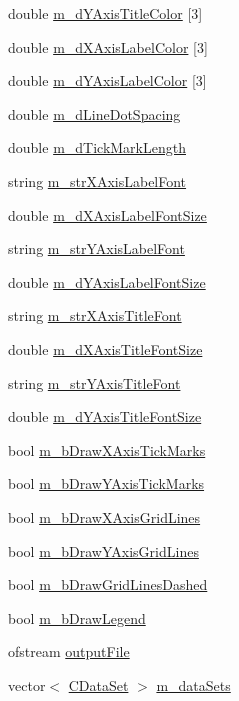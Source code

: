 \begin{DoxyCompactItemize}
\item 
double \hyperlink{class_c_plot2_d_afbe19e1ea967b1d015e8081eebfcfbad}{m\-\_\-d\-Y\-Axis\-Title\-Color} \mbox{[}3\mbox{]}
\item 
double \hyperlink{class_c_plot2_d_a8c07672b5c902ee6dc348abc50f59f68}{m\-\_\-d\-X\-Axis\-Label\-Color} \mbox{[}3\mbox{]}
\item 
double \hyperlink{class_c_plot2_d_a5015c44c4b026dcd0f09a1bd3b3a47b9}{m\-\_\-d\-Y\-Axis\-Label\-Color} \mbox{[}3\mbox{]}
\item 
double \hyperlink{class_c_plot2_d_ab8bb9d348dcda0bbc15fa5e1b92cb07d}{m\-\_\-d\-Line\-Dot\-Spacing}
\item 
double \hyperlink{class_c_plot2_d_aae3dd5651d0422be83f8469ff4a848df}{m\-\_\-d\-Tick\-Mark\-Length}
\item 
string \hyperlink{class_c_plot2_d_a64ee61caba37d0df489eee5107bab55a}{m\-\_\-str\-X\-Axis\-Label\-Font}
\item 
double \hyperlink{class_c_plot2_d_a7666e3f16b0ba5617549ed5d838ad60d}{m\-\_\-d\-X\-Axis\-Label\-Font\-Size}
\item 
string \hyperlink{class_c_plot2_d_ab402c414dc5bca0a88790388f0660f91}{m\-\_\-str\-Y\-Axis\-Label\-Font}
\item 
double \hyperlink{class_c_plot2_d_a452e31df37bbdbd99a04ba349b15cc0c}{m\-\_\-d\-Y\-Axis\-Label\-Font\-Size}
\item 
string \hyperlink{class_c_plot2_d_a7f79e280f598ac9630386dc8ad92e2e7}{m\-\_\-str\-X\-Axis\-Title\-Font}
\item 
double \hyperlink{class_c_plot2_d_a53755986015b3689190dfc4b533f7c36}{m\-\_\-d\-X\-Axis\-Title\-Font\-Size}
\item 
string \hyperlink{class_c_plot2_d_a584a45f006ede90d11adc58284a8e981}{m\-\_\-str\-Y\-Axis\-Title\-Font}
\item 
double \hyperlink{class_c_plot2_d_a0c0dbccc68c5265ff35ba519e183227d}{m\-\_\-d\-Y\-Axis\-Title\-Font\-Size}
\item 
bool \hyperlink{class_c_plot2_d_abac7a667e24766f684bcce6d6215741d}{m\-\_\-b\-Draw\-X\-Axis\-Tick\-Marks}
\item 
bool \hyperlink{class_c_plot2_d_a0d4fbd6a642fa301e1b22302c334d09c}{m\-\_\-b\-Draw\-Y\-Axis\-Tick\-Marks}
\item 
bool \hyperlink{class_c_plot2_d_a577e9103e57c69d778d27eee966761cd}{m\-\_\-b\-Draw\-X\-Axis\-Grid\-Lines}
\item 
bool \hyperlink{class_c_plot2_d_aa54323d6a592be700acd7e3dc0ec32af}{m\-\_\-b\-Draw\-Y\-Axis\-Grid\-Lines}
\item 
bool \hyperlink{class_c_plot2_d_ac340112b317acfbd92736155a281fc4a}{m\-\_\-b\-Draw\-Grid\-Lines\-Dashed}
\item 
bool \hyperlink{class_c_plot2_d_a14a8fe2cd70455c3515c5b7224e11526}{m\-\_\-b\-Draw\-Legend}
\item 
ofstream \hyperlink{class_c_plot2_d_afaca19adeb7c2eced38ce6f7edcd87ec}{output\-File}
\item 
vector$<$ \hyperlink{class_c_data_set}{C\-Data\-Set} $>$ \hyperlink{class_c_plot2_d_a97f2e6d8b2ee958dd248847b688abeac}{m\-\_\-data\-Sets}
\end{DoxyCompactItemize}


